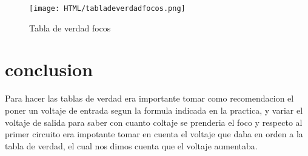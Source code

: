\documentclass[11pt,a4paper]{article}
\begin{document}
\begin{figure}[h]
\centering
\texttt{[image: HTML/tabladeverdadfocos.png]} 
\caption{Tabla de verdad focos}
\end{figure}

\newpage 

\section{conclusion}
Para hacer las tablas de verdad era importante tomar como recomendacion el poner un voltaje de entrada segun la formula indicada en la practica, y variar el voltaje de salida para saber con cuanto coltaje se prenderia el foco y respecto al primer circuito era impotante tomar en cuenta el voltaje que daba en orden a la tabla de verdad, el cual nos dimos cuenta que el voltaje aumentaba.
\end{document}
